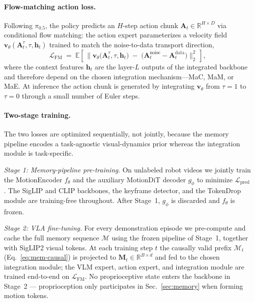 \documentclass{article}
\begin{document}
\paragraph{Flow-matching action loss.}
Following $\pi_{0.5}$, the policy predicts an $H$-step action chunk
$\mathbf{A}_t \in \mathbb{R}^{H\times D}$ via conditional flow matching:
the action expert parameterizes a velocity field
$\mathbf{v}_\theta(\mathbf{A}_t^\tau,\tau,\mathbf{h}_t)$ trained to match
the noise-to-data transport direction,
\begin{equation}
  \mathcal{L}_{\mathrm{FM}} \;=\;
  \mathbb{E}\!\left[\,
    \big\| \mathbf{v}_\theta\!\big(\mathbf{A}_t^\tau,\tau,\mathbf{h}_t\big)
    \;-\; \big(\mathbf{A}_t^{\mathrm{noise}} - \mathbf{A}_t^{\mathrm{data}}\big) \big\|_2^2
  \,\right],
  \label{eq:fm-loss}
\end{equation}
where the context features $\mathbf{h}_t$ are the layer-$L$ outputs of the
integrated backbone and therefore depend on the chosen integration
mechanism---MaC, MaM, or MaE. At inference the action chunk is generated
by integrating $\mathbf{v}_\theta$ from $\tau\!=\!1$ to $\tau\!=\!0$ through
a small number of Euler steps.

\paragraph{Two-stage training.}
The two losses are optimized sequentially, not jointly, because the memory
pipeline encodes a task-agnostic visual-dynamics prior whereas the
integration module is task-specific.

\emph{Stage 1: Memory-pipeline pre-training.} On unlabeled robot videos we
jointly train the MotionEncoder $f_\theta$ and the auxiliary MotionDiT
decoder $g_\phi$ to minimize $\mathcal{L}_{\mathrm{pred}}$. The SigLIP and
CLIP backbones, the keyframe detector, and the TokenDrop module are
training-free throughout. After Stage~1, $g_\phi$ is discarded and
$f_\theta$ is frozen.

\emph{Stage 2: VLA fine-tuning.} For every demonstration episode we
pre-compute and cache the full memory sequence $\mathcal{M}$ using the
frozen pipeline of Stage~1, together with SigLIP2 visual tokens. At each
training step $t$ the causally valid prefix
$\mathcal{M}_t$ (Eq.~\ref{eq:mem-causal}) is projected to
$\mathbf{M}_t \in \mathbb{R}^{B\times d}$ and fed to the chosen integration
module; the VLM expert, action expert, and integration module are trained
end-to-end on $\mathcal{L}_{\mathrm{FM}}$. No proprioceptive state enters
the backbone in Stage~2 --- proprioception only participates in
Sec.~\ref{sec:memory} when forming motion tokens.
\end{document}
